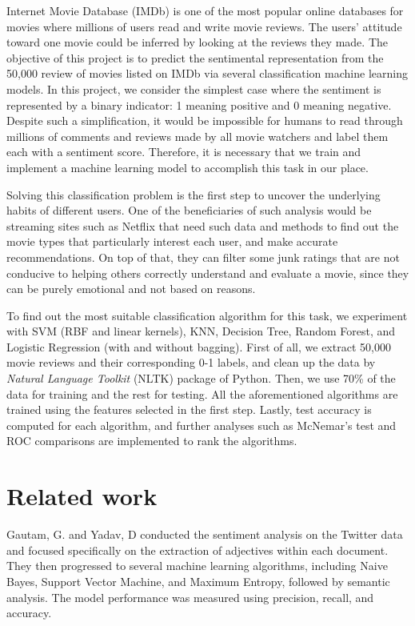 \documentclass[10pt,twocolumn]{article}
\begin{document}
	Internet Movie Database (IMDb) is one of the most popular online databases for movies where millions of users read and write movie reviews. The users’ attitude toward one movie could be inferred by looking at the reviews they made. The objective of this project is to predict the sentimental
	representation from the 50,000 review of movies listed on IMDb\cite{maas-EtAl:2011:ACL-HLT2011} via several classification machine learning models. In this project, we consider the simplest case where the sentiment is represented by a binary indicator: 1 meaning positive and 0 meaning negative. Despite such a simplification, it would be impossible for humans to read through millions of comments and reviews made by all movie watchers and label them each with a sentiment score. Therefore, it is necessary that we train and implement a machine learning model to accomplish this task in our place. 
	
	Solving this classification problem is the first step to uncover the underlying habits of different users. One of the beneficiaries of such analysis would be streaming sites such as Netflix that need such data and methods to find out the movie types that particularly interest each user, and make accurate recommendations. On top of that, they can filter some junk ratings that are not conducive to helping others correctly understand and evaluate a movie, since they can be purely emotional and not based on reasons. 
	
	To find out the most suitable classification algorithm for this task, we experiment with SVM (RBF and linear kernels), KNN, Decision Tree, Random Forest, and Logistic Regression (with and without bagging). First of all, we extract 50,000 movie reviews and their corresponding 0-1 labels, and clean up the data by \textit{Natural Language Toolkit} (NLTK) package of Python. Then, we use 70\% of the data for training and the rest for testing. All the aforementioned algorithms are trained using the features selected in the first step. Lastly, test accuracy is computed for each algorithm, and further analyses such as McNemar's test and ROC comparisons are implemented to rank the algorithms.
	\section{Related work}
	Gautam, G. and Yadav, D conducted the sentiment analysis on the Twitter data and focused specifically on the extraction of adjectives within each document\cite{6897213}. They then progressed to several machine learning algorithms, including Naive Bayes, Support Vector Machine, and Maximum Entropy, followed by semantic analysis. The model performance was measured using precision, recall, and accuracy.
	
\end{document}
